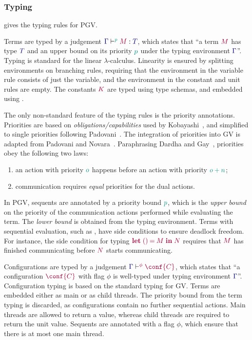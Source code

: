 \documentclass[main.tex]{subfiles}
\begin{document}


\subsubsection*{Typing}
 gives the typing rules for PGV.

Terms are typed by a judgement $\tseq[\cs{p}]{\ty{\Gamma}}{M}{T}$, which states that ``a term $\tm{M}$ has type $\ty{T}$ and an upper bound on its priority $\cs{p}$ under the typing environment $\ty{\Gamma}$''. Typing is standard for the linear $\lambda$-calculus. Linearity is ensured by splitting environments on branching rules, requiring that the environment in the variable rule consists of just the variable, and the environment in the constant and unit rules are empty. The constants $\tm{K}$ are typed using type schemas, and embedded using .

The only non-standard feature of the typing rules is the priority annotations. Priorities are based on \emph{obligations/capabilities} used by Kobayashi~\cite{kobayashi06}, and simplified to single priorities following Padovani~\cite{padovani14}. The integration of priorities into GV is adapted from Padovani and Novara~\cite{padovaninovara15}. Paraphrasing Dardha and Gay~\cite{dardhagay18}, priorities obey the following two laws:
\begin{enumerate}
  \item an action with priority $\cs{o}$ happens before an action with priority $\cs{o+n}$;
  \item communication requires \emph{equal} priorities for the dual actions.
\end{enumerate}

In PGV, sequents are annotated by a priority bound $\cs{p}$, which is the \emph{upper bound} on the priority of the communication actions performed while evaluating the term. The \emph{lower bound} is obtained from the typing environment. Terms with sequential evaluation, such as , have side conditions to ensure deadlock freedom. For instance, the side condition for typing $\tm{\letunit{M}{N}}$ requires that $\tm{M}$ has finished communicating before $\tm{N}$ starts communicating.

Configurations are typed by a judgement $\cseq[\phi]{\ty{\Gamma}}{\conf{C}}$, which states that ``a configuration $\tm{\conf{C}}$ with flag $\phi$ is well-typed under typing environment $\ty{\Gamma}$''. Configuration typing is based on the standard typing for GV. Terms are embedded either as main or as child threads. The priority bound from the term typing is discarded, as configurations contain no further sequential actions. Main threads are allowed to return a value, whereas child threads are required to return the unit value. Sequents are annotated with a flag $\phi$, which ensure that there is at most one main thread.
\end{document}
